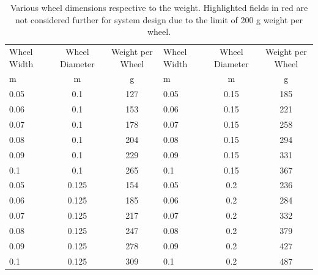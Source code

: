 \begin{table}[htb]
\centering
\caption{Various wheel dimensions respective to the weight. Highlighted fields in red are not considered further for system design due to the limit of 200 g weight per wheel.}
\begin{adjustbox}{max width=\textwidth}
\begin{tabular}[l]{lcc|lcc}

	\toprule
		\multicolumn{1}{l}{Wheel Width} & \multicolumn{1}{c}{Wheel Diameter} & \multicolumn{1}{c|}{Weight per Wheel}	& \multicolumn{1}{l}{Wheel Width}	 & \multicolumn{1}{c}{Wheel Diameter} 		& \multicolumn{1}{c}{Weight per Wheel}    \\

\multicolumn{1}{l}{\:\:\:\:\:\: m}		& \multicolumn{1}{c}{m} 			& \multicolumn{1}{c|}{g} 					& \multicolumn{1}{l}{\:\:\:\:\:\: m}& \multicolumn{1}{c}{m}					& \multicolumn{1}{c}{g} \\
	\midrule
	
	0.05	&	0.1		&	127		& 0.05		&	0.15	&	185									\\ 
	0.06	&	0.1		&	153		&	0.06	&	0.15	&	\cellcolor[HTML]{CB0000}221		\\	
	0.07	&	0.1		&	178		&	0.07	&	0.15	&	\cellcolor[HTML]{CB0000}258		\\
	0.08	&	0.1		&	\cellcolor[HTML]{CB0000}204	&	0.08	&	0.15	&	\cellcolor[HTML]{CB0000}294		\\	
	0.09	&	0.1		&	\cellcolor[HTML]{CB0000}229	&	0.09	&	0.15	&	\cellcolor[HTML]{CB0000}331		\\
	0.1		&	0.1		&	\cellcolor[HTML]{CB0000}265	&	0.1		&	0.15	&	\cellcolor[HTML]{CB0000}367		\\	
	0.05	&	0.125	&	154		&	0.05	&	0.2		&	\cellcolor[HTML]{CB0000}236		\\
	0.06	&	0.125	&	185		&	0.06	&	0.2		&	\cellcolor[HTML]{CB0000}284		\\
	0.07	&	0.125	&	\cellcolor[HTML]{CB0000}217		&	0.07	&	0.2		&	\cellcolor[HTML]{CB0000}332		\\	
	0.08	&	0.125	&	\cellcolor[HTML]{CB0000}247		&	0.08	&	0.2		&	\cellcolor[HTML]{CB0000}379		\\
	0.09	&	0.125	&	\cellcolor[HTML]{CB0000}278		&	0.09	&	0.2		&	\cellcolor[HTML]{CB0000}427		\\
	0.1		&	0.125	&	\cellcolor[HTML]{CB0000}309		&	0.1		&	0.2		&	\cellcolor[HTML]{CB0000}487		\\
	
	\bottomrule

\end{tabular}
\end{adjustbox}
\label{tab:Geometry}
\end{table}

